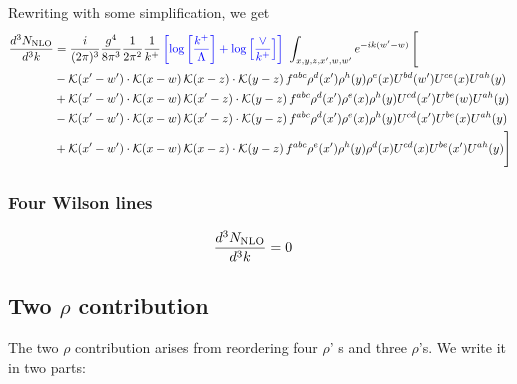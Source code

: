 \documentclass[aps,prd,amsmath,amssymb,nofootinbib]{revtex4-2}
\numberwithin{equation}{section}
\begin{document}
Rewriting with some simplification, we get
\begin{align}
      \frac{d^{3}N_{\rm NLO}}{d^{3}k} & = \frac{i}{(2\pi)^{3}}\frac{g^{4}}{8\pi^{3}}\frac{1}{2\pi^{2}} \frac{1}{k^{+}}\,{\color{blue}\left[\log{\left[\frac{k^{+}}{\Lambda}\right]}+\log{\left[\frac{\vee}{k^{+}}\right]}\right]}\,\,\int_{x,y,z,x^{\prime},w,w^{\prime}}e^{-ik(w^{\prime}-w)}\, \Bigg[\notag \\ & - \mathcal{K}(x'-w')\cdot \mathcal{K}(x-w)\, \mathcal{K}(x-z)\cdot \mathcal{K}(y-z)\, f^{a b c} \rho^{d}(x') \rho^{h}(y) \rho^{e}(x) U^{bd}(w') U^{ce}(x) U^{a h}(y)\nonumber\\
    &+ \mathcal{K}(x'-w')\cdot \mathcal{K}(x-w)\,\mathcal{K}(x'-z)\cdot \mathcal{K}(y-z)\, f^{a b c} \rho^{d}(x') \rho^{e}(x) \rho^{h}(y) U^{cd}(x') U^{be}(w) U^{a h}(y)\nonumber\\
    &- \mathcal{K}(x'-w')\cdot \mathcal{K}(x-w)\,\mathcal{K}(x'-z)\cdot \mathcal{K}(y-z)\, f^{a b c} \rho^{d}(x') \rho^{e}(x) \rho^{h}(y) U^{cd}(x') U^{b e}(x) U^{a h}(y)\nonumber\\
    &+  \mathcal{K}(x'-w')\cdot \mathcal{K}(x-w)\, \mathcal{K}(x-z)\cdot \mathcal{K}(y-z)\, f^{a b c} \rho^{e}(x') \rho^{h}(y) \rho^{d}(x) U^{cd}(x) U^{b e}(x') U^{a h}(y) \Bigg]
\end{align}
\subsubsection{Four Wilson lines}
\begin{align}
    \frac{d^{3}N_{\rm NLO}}{d^{3}k} & = 0 
\end{align}    
\subsection{Two $\rho$ contribution}
The two $\rho$ contribution arises from reordering four $\rho$' s and three $\rho$'s. We write it in two parts:
\end{document}
